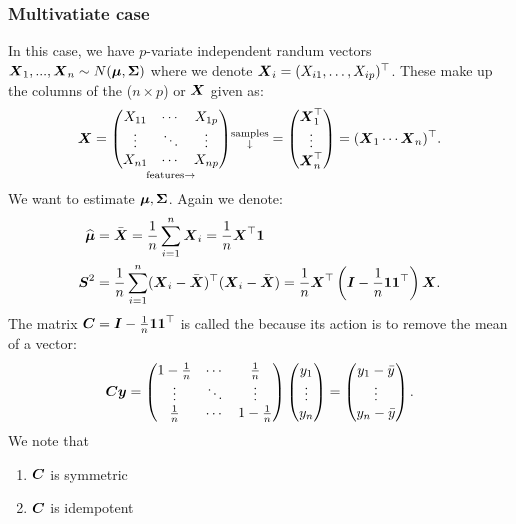 \subsubsection{Multivatiate case}
In this case, we have $p$-variate independent randum vectors $\boldsymbol{X}_1,...,\boldsymbol{X}_n \sim N(\boldsymbol{\mu}, \boldsymbol{\Sigma})$ where we denote $\boldsymbol{X}_i=(X_{i1},\dots,X_{ip})^\top$. These make up the columns of the ($n\times p$)  or  $\boldsymbol{X}$ given as:
$$
    \boldsymbol{X} = 
    \underset{\mathrm{features} \rightarrow}{
    \begin{pmatrix}
        X_{11} & \cdots & X_{1p} \\
        \vdots & \ddots & \vdots \\
        X_{n1} & \cdots & X_{np}
    \end{pmatrix}}
    \substack{\text{samples} \\ \downarrow}
    = \begin{pmatrix}
        \boldsymbol{X}_1^\top \\ \vdots \\ \boldsymbol{X}_n^\top
    \end{pmatrix}= (\boldsymbol{X}_1 \cdots \boldsymbol{X}_n)^\top.
$$
We want to estimate $\boldsymbol{\mu}, \boldsymbol{\Sigma}$. Again we denote:
\begin{align*}
    \widehat{\boldsymbol{\mu}} &= \bar{\boldsymbol{X}} = \frac{1}{n} \sum_{i=1}^n \boldsymbol{X}_i = \frac{1}{n}\boldsymbol{X}^\top \boldsymbol{1} \\
    \boldsymbol{S}^2 
    &= \frac{1}{n} \sum_{i=1}^n (\boldsymbol{X}_i-\bar{\boldsymbol{X}})^\top(\boldsymbol{X}_i-\bar{\boldsymbol{X}}) 
    = \frac{1}{n} \boldsymbol{X}^\top\left( \boldsymbol{I}-\frac{1}{n} \boldsymbol{1}\boldsymbol{1}^\top \right)\boldsymbol{X}.
\end{align*}
The matrix $\boldsymbol{C}=\boldsymbol{I}-\frac{1}{n} \boldsymbol{1}\boldsymbol{1}^\top$ is called the  because its action is to remove the mean of a vector:
$$
    \boldsymbol{C} \boldsymbol{y} = \begin{pmatrix}
        1-\frac{1}{n} & \cdots & \frac{1}{n} \\
        \vdots & \ddots & \vdots \\
        \frac{1}{n} & \cdots & 1-\frac{1}{n}
    \end{pmatrix}
    \begin{pmatrix}
        y_1 \\ \vdots \\ y_n
    \end{pmatrix}
    = 
    \begin{pmatrix}
        y_1-\bar{y} \\ \vdots \\ y_n-\bar{y}
    \end{pmatrix}.
$$
We note that 
\begin{enumerate}
    \item $\boldsymbol{C}$ is symmetric
    \item $\boldsymbol{C}$ is idempotent
\end{enumerate}
